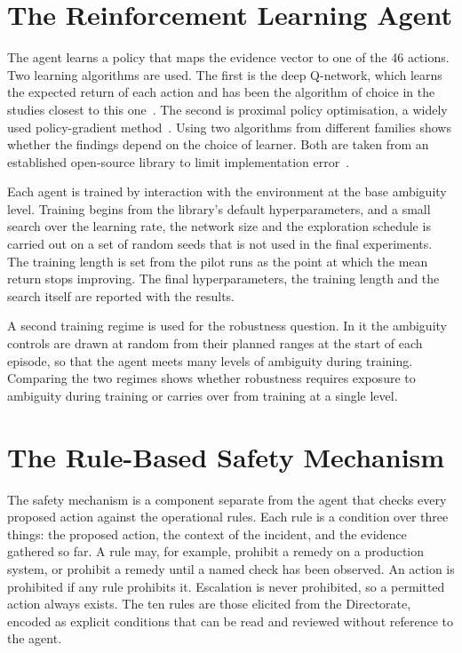 \documentclass[12pt,a4paper]{article}
\begin{document}
\section{The Reinforcement Learning Agent}
\label{sec:agent}

The agent learns a policy that maps the evidence vector to one of the 46 actions. Two learning algorithms are used. The first is the deep Q-network, which learns the expected return of each action and has been the algorithm of choice in the studies closest to this one~\cite{mnih2015,janisch2019,alauthman2026}. The second is proximal policy optimisation, a widely used policy-gradient method~\cite{schulman2017}. Using two algorithms from different families shows whether the findings depend on the choice of learner. Both are taken from an established open-source library to limit implementation error~\cite{raffin2021}.

Each agent is trained by interaction with the environment at the base ambiguity level. Training begins from the library's default hyperparameters, and a small search over the learning rate, the network size and the exploration schedule is carried out on a set of random seeds that is not used in the final experiments. The training length is set from the pilot runs as the point at which the mean return stops improving. The final hyperparameters, the training length and the search itself are reported with the results.

A second training regime is used for the robustness question. In it the ambiguity controls are drawn at random from their planned ranges at the start of each episode, so that the agent meets many levels of ambiguity during training. Comparing the two regimes shows whether robustness requires exposure to ambiguity during training or carries over from training at a single level.

\section{The Rule-Based Safety Mechanism}
\label{sec:mechanism}

The safety mechanism is a component separate from the agent that checks every proposed action against the operational rules. Each rule is a condition over three things: the proposed action, the context of the incident, and the evidence gathered so far. A rule may, for example, prohibit a remedy on a production system, or prohibit a remedy until a named check has been observed. An action is prohibited if any rule prohibits it. Escalation is never prohibited, so a permitted action always exists. The ten rules are those elicited from the Directorate, encoded as explicit conditions that can be read and reviewed without reference to the agent.
\end{document}
